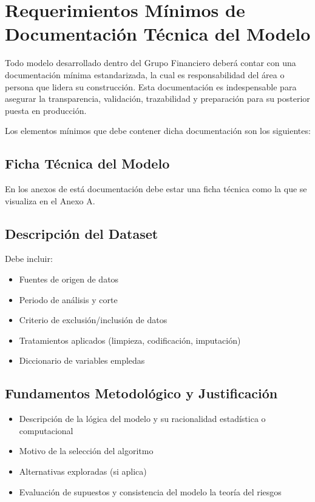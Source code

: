 \documentclass[11pt,oneside]{article}%
\begin{document}
\section{Requerimientos Mínimos de Documentación Técnica del Modelo}

Todo modelo desarrollado dentro del Grupo Financiero deberá contar con una documentación mínima estandarizada, la cual es responsabilidad del área o persona que lidera su construcción. Esta documentación es indespensable para asegurar la transparencia, validación, trazabilidad y preparación para su posterior puesta en producción. 

Los elementos mínimos que debe contener dicha documentación son los siguientes: 

\subsection{Ficha Técnica del Modelo}

En los anexos de está documentación debe estar una ficha técnica como la que se visualiza en el Anexo A. 

\subsection{Descripción del Dataset}

Debe incluir: 
\begin{itemize}
\item Fuentes de origen de datos
\item Periodo de análisis y corte
\item Criterio de exclusión/inclusión de datos 
\item Tratamientos aplicados (limpieza, codificación, imputación)
\item Diccionario de variables empledas 
\end{itemize}

\subsection{Fundamentos Metodológico y Justificación} 
\begin{itemize}
\item Descripción de la lógica del modelo y su racionalidad estadística o computacional
\item Motivo de la selección del algoritmo
\item Alternativas exploradas (si aplica)
\item Evaluación de supuestos y consistencia del modelo la teoría del riesgos
\end{itemize}
\end{document}
